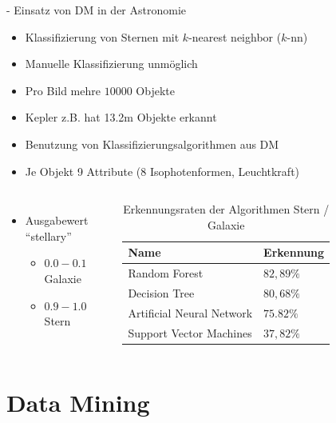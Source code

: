 \documentclass[fleqn,11pt,aspectratio=43]{beamer}
\begin{document}
\begin{frame}{\insertsectionhead - Einsatz von DM in der Astronomie}
\begin{itemize}
\item Klassifizierung von Sternen mit $k$-nearest neighbor ($k$-nn)
\item Manuelle Klassifizierung unmöglich  \cite{ester2000knowledge}
\item Pro Bild mehre $10000$ Objekte
\item Kepler z.B. hat 13.2m Objekte erkannt
\item Benutzung von Klassifizierungsalgorithmen aus DM
\item Je Objekt 9 Attribute (8 Isophotenformen, Leuchtkraft)
\end{itemize}
\begin{columns}[onlytextwidth]
    	\vspace{-9.5em}
		\begin{itemize}
		\item Ausgabewert \enquote{stellary}
		\begin{itemize}
		\item $0.0 - 0.1$ Galaxie
		\item $0.9 - 1.0$ Stern
		\end{itemize}
		\end{itemize}
	    \begin{table}
	    \begin{tabular}{l|l}
	    Name & Erkennung\\ \hline
	    Random Forest & $82,89\%$ \\
	    Decision Tree & $80,68\%$ \\
	    Artificial Neural Network & $75.82\%$ \\
	    Support Vector Machines & $37,82\%$ \\
	    \end{tabular}
	    \caption{Erkennungsraten der Algorithmen Stern / Galaxie \cite{o2009star}}
	    \end{table}
\end{columns}
\end{frame}

\section{Data Mining~}
\end{document}
